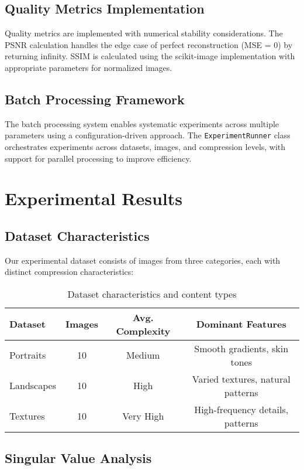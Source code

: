 \documentclass[12pt,a4paper]{article}
\begin{document}
\subsection{Quality Metrics Implementation}

Quality metrics are implemented with numerical stability considerations. The PSNR calculation handles the edge case of perfect reconstruction (MSE = 0) by returning infinity. SSIM is calculated using the scikit-image implementation with appropriate parameters for normalized images.

\subsection{Batch Processing Framework}

The batch processing system enables systematic experiments across multiple parameters using a configuration-driven approach. The \texttt{ExperimentRunner} class orchestrates experiments across datasets, images, and compression levels, with support for parallel processing to improve efficiency.

\section{Experimental Results}

\subsection{Dataset Characteristics}

Our experimental dataset consists of images from three categories, each with distinct compression characteristics:

\begin{table}[H]
\centering
\begin{tabular}{@{}lccc@{}}
\toprule
Dataset & Images & Avg. Complexity & Dominant Features \\
\midrule
Portraits & 10 & Medium & Smooth gradients, skin tones \\
Landscapes & 10 & High & Varied textures, natural patterns \\
Textures & 10 & Very High & High-frequency details, patterns \\
\bottomrule
\end{tabular}
\caption{Dataset characteristics and content types}
\label{tab:datasets}
\end{table}

\subsection{Singular Value Analysis}
\end{document}
